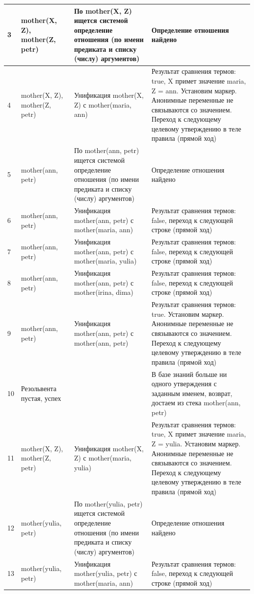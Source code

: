 \documentclass[a4paper,14pt]{extreport} %
\begin{document}
\begin{longtable}{|p{0.5cm}|p{4cm}|p{7cm}|p{5.5cm}|}
	3 &mother(X, Z), mother(Z, petr)& По mother(X, Z)  ищется системой определение отношения (по имени предиката и списку (числу) аргументов) & Определение отношения найдено \\ \hline
	4 &mother(X, Z), mother(Z, petr)& Унификация mother(X, Z) с mother(maria, ann) & Результат сравнения термов: true, X примет значение maria, Z = ann. Установим маркер. Анонимные переменные не связываются со значением. Переход к следующему целевому утверждению в теле правила (прямой ход) \\ \hline
	5 & mother(ann, petr) & По mother(ann, petr)  ищется системой определение отношения (по имени предиката и списку (числу) аргументов) & Определение отношения найдено \\ \hline
	6 &mother(ann, petr) & Унификация mother(ann, petr) с mother(maria, ann) & Результат сравнения термов: false, переход к следующей строке (прямой ход) \\ \hline
	7 &mother(ann, petr) & Унификация mother(ann, petr) с mother(maria, yulia) & Результат сравнения термов: false, переход к следующей строке (прямой ход) \\ \hline
	8 &mother(ann, petr) & Унификация mother(ann, petr) с mother(irina, dima) & Результат сравнения термов: false, переход к следующей строке (прямой ход) \\ \hline
	9 &mother(ann, petr) & Унификация mother(ann, petr) с mother(ann, petr) & Результат сравнения термов: true. Установим маркер. Анонимные переменные не связываются со значением. Переход к следующему целевому утверждению в теле правила (прямой ход) \\ \hline
	10 &Резольвента пустая, успех&  &  В базе знаний больше ни одного утверждения с заданным именем, возврат, достаем из стека mother(ann, petr) \\ \hline
	11 &mother(X, Z), mother(Z, petr)& Унификация mother(X, Z) с mother(maria, yulia) & Результат сравнения термов: true, X примет значение maria, Z = yulia. Установим маркер. Анонимные переменные не связываются со значением. Переход к следующему целевому утверждению в теле правила (прямой ход) \\ \hline
	12 & mother(yulia, petr) & По mother(yulia, petr)  ищется системой определение отношения (по имени предиката и списку (числу) аргументов) & Определение отношения найдено \\ \hline
	13 &mother(yulia, petr) & Унификация mother(yulia, petr) с mother(maria, ann) & Результат сравнения термов: false, переход к следующей строке (прямой ход) \\ \hline

\end{longtable}
\end{document}
